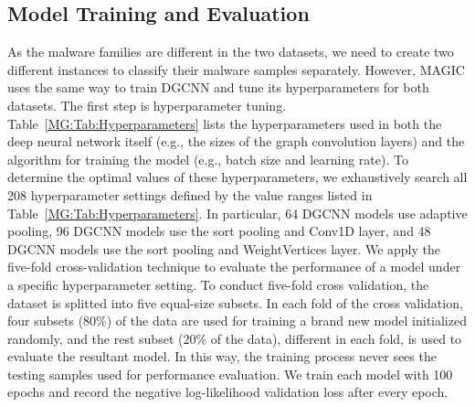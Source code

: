 \subsection{Model Training and Evaluation}
As the malware families are different in the two datasets, we need to create two different \sysname instances to classify their malware samples separately. However, MAGIC uses the same way to train DGCNN and tune its hyperparameters for both datasets.
The first step is hyperparameter tuning.
Table~\ref{MG:Tab:Hyperparameters} lists the hyperparameters used in both the deep neural network itself (e.g., the sizes of the graph convolution layers) and the algorithm for training the model (e.g., batch size and learning rate).
To determine the optimal values of these hyperparameters,
we exhaustively search all 208 hyperparameter settings defined by the value ranges listed in Table~\ref{MG:Tab:Hyperparameters}.
In particular, 64 DGCNN models use adaptive pooling, 96 DGCNN models use the sort pooling and Conv1D layer, and 48 DGCNN models use the sort pooling and WeightVertices layer.
We apply the five-fold cross-validation technique to evaluate the performance of a model under a specific hyperparameter setting.
To conduct five-fold cross validation, the dataset is splitted into five equal-size subsets.
In each fold of the cross validation, four subsets (80\%) of the data are used for training a brand new model initialized randomly,
and the rest subset (20\% of the data), different in each fold, is used to evaluate the resultant model.
In this way, the training process never sees the testing samples used for performance evaluation.
We train each model with 100 epochs and record the negative log-likelihood validation loss after every epoch.

